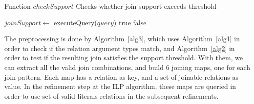 \begin{algorithm}[h!]
  \caption{Function $checkSupport$ \newline Checks whether join support exceeds threshold}
     {
    }
    $joinSupport \leftarrow$ executeQuery($query$)\;
      {
      \Return true\;
    }{
      \Return false\;
    }
  \label{alg2}
\end{algorithm}


The preprocessing is done by Algorithm~\ref{alg3}, which uses Algorithm~\ref{alg1} in order to check if
the relation argument types match, and Algorithm~\ref{alg2} in order to test if the resulting join satisfies the
support threshold. With them, we can extract all the valid join combinations, and build 6 joining maps, one for each
join pattern. Each map has a relation as key, and a set of joinable relations as value. In the refinement step at the
ILP algorithm, these maps are queried in order to use set of valid literals relations in the subsequent refinements.

